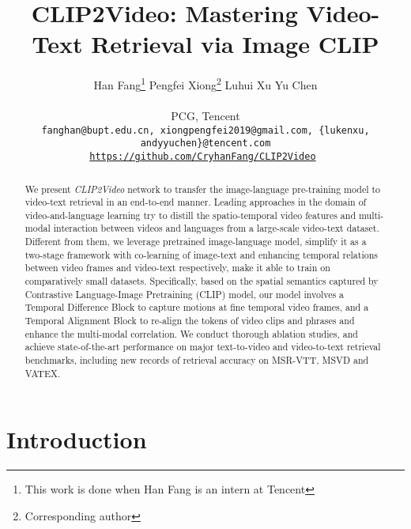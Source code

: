 \documentclass[final]{cvpr}
\newcommand*{\affaddr}[1]{#1}
\begin{document}
\title{CLIP2Video: Mastering Video-Text Retrieval via Image CLIP}

\author{
    Han Fang\thanks {This work is done when Han Fang is an intern at Tencent} \quad 
    Pengfei Xiong\footnotemark[1] \thanks {Corresponding author} \quad 
    Luhui Xu \quad  
    Yu Chen \quad \\\\

\affaddr{PCG, Tencent} \\

\tt\small fanghan@bupt.edu.cn, xiongpengfei2019@gmail.com, \{lukenxu, andyyuchen\}@tencent.com \\
\tt\small \url{https://github.com/CryhanFang/CLIP2Video}
}
\maketitle

\begin{abstract}


We present \textit{CLIP2Video} network to transfer the image-language pre-training model to video-text retrieval in an end-to-end manner. Leading approaches in the domain of video-and-language learning try to distill the spatio-temporal video features and multi-modal interaction between videos and languages from a large-scale video-text dataset.
Different from them, we leverage pretrained image-language model, simplify it as a two-stage framework with co-learning of image-text and enhancing temporal relations between video frames and video-text respectively, make it able to train on comparatively small datasets. 
Specifically, based on the spatial semantics captured by Contrastive Language-Image Pretraining (CLIP) model, our model involves a Temporal Difference Block to capture motions at fine temporal video frames, and a Temporal Alignment Block to re-align the tokens of video clips and phrases  and enhance the multi-modal correlation.
We conduct thorough ablation studies, and achieve state-of-the-art performance on major text-to-video and video-to-text retrieval benchmarks, including new records of retrieval accuracy on MSR-VTT, MSVD and VATEX.


\end{abstract}



\section{Introduction}
\end{document}
